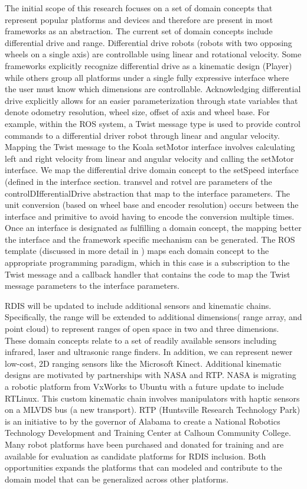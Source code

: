 The initial scope of this research focuses on a set of domain concepts that represent popular platforms and devices and therefore are present in most frameworks as an abstraction.   The current set of domain concepts include {\sc differential drive} and {\sc range}.   Differential drive robots (robots with two opposing wheels on a single axis) are controllable using linear and rotational velocity.   Some frameworks explicitly recognize differential drive as a kinematic design (Player) while others group all platforms under a single fully expressive interface where the user must know which dimensions are controllable.  Acknowledging differential drive explicitly allows for an easier parameterization through state variables that denote odometry resolution, wheel size, offset of axis and wheel base.  For example, within the ROS system, a {\sc Twist} message type is used to provide control commands to a differential driver robot through linear and angular velocity.  Mapping the {\sc Twist} message to the Koala setMotor interface involves calculating left and right velocity from linear and angular velocity and calling the setMotor interface.  We map the differential drive domain concept to the {\sc setSpeed} interface (defined in the interface section.   {\sc transvel} and {\sc rotvel} are parameters of the controlDIfferentialDrive abstraction that map to the interface parameters.  The unit conversion (based on wheel base and encoder resolution) occurs between the interface and primitive to avoid having to encode the conversion multiple times.  Once an interface is designated as fulfilling a domain concept, the mapping better the interface and the framework specific mechanism can be generated.  The ROS template (discussed in more detail in \cite{Anderson2012}) maps each domain concept to the appropriate programming paradigm, which in this case is a subscription to the {\sc Twist} message and a callback handler that contains the code to map the {\sc Twist} message parameters to the interface parameters.   

RDIS will be updated to include additional sensors and kinematic chains.  Specifically, the {\sc range} will be extended to additional dimensions( {\sc range array}, and {\sc point cloud}) to represent ranges of open space in two and three dimensions.  These domain concepts relate to a set of readily available sensors including infrared, laser and ultrasonic range finders.   In addition, we can represent newer low-cost, 2D ranging sensors like the Microsoft Kinect.   Additional kinematic designs are motivated by partnerships with NASA and RTP.  NASA is migrating a robotic platform from VxWorks to Ubuntu with a future update to include RTLinux.  This custom kinematic chain involves manipulators with haptic sensors on a MLVDS bus (a new transport).  RTP (Huntsville Research Technology Park) is an initiative to by the governor of Alabama to create a National Robotics Technology Development and Training Center at Calhoun Community College.  Many robot platforms have been purchased and donated for training and are available for evaluation as candidate platforms for RDIS inclusion.  Both opportunities expands the platforms that can modeled and contribute to the domain model that can be generalized across other platforms. 

